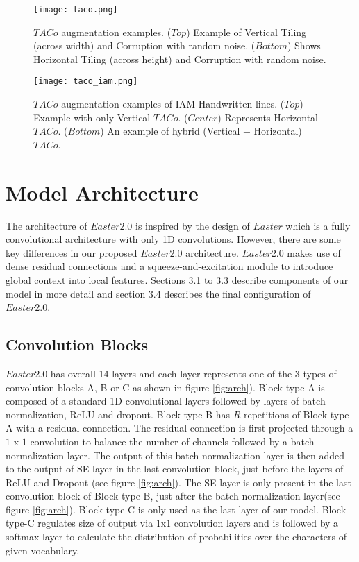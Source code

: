 \documentclass{article}
\begin{document}
\begin{figure}
  \centering
  \texttt{[image: taco.png]}
  \caption{$TACo$ augmentation examples. ($Top$) Example of Vertical Tiling (across width) and Corruption with random noise. ($Bottom$) Shows Horizontal Tiling (across height) and Corruption with random noise.}
  \label{fig:TACo}
\end{figure}

\begin{figure}
  \centering
  \texttt{[image: taco\_iam.png]}
  \caption{$TACo$ augmentation examples of IAM-Handwritten-lines. ($Top$) Example with only Vertical $TACo$. ($Center$) Represents Horizontal $TACo$. ($Bottom$) An example of hybrid (Vertical + Horizontal) $TACo$.}
  \label{fig:taco_iam}
\end{figure}

\section{Model Architecture}
\label{sec:headings}
The architecture of $Easter2.0$ is inspired by the design of $Easter$\cite{Chaudhary2021EASTER} which is a fully convolutional architecture with only 1D convolutions. However, there are some key differences in our proposed $Easter2.0$ architecture. $Easter2.0$ makes use of dense residual connections and a squeeze-and-excitation module to introduce global context into local features. Sections 3.1 to 3.3 describe components of our model in more detail and section 3.4 describes the final configuration of $Easter2.0$.

\subsection{Convolution Blocks}
$Easter2.0$ has overall 14 layers and each layer represents one of the 3 types of convolution blocks A, B or C as shown in figure \ref{fig:arch}). Block type-A is composed of a standard 1D convolutional layers followed by layers of batch normalization, ReLU and dropout. Block type-B has $R$ repetitions of Block type-A with a residual connection. The residual connection is first projected through a $1$ x $1$ convolution to balance the number of channels followed by a batch normalization layer. The output of this batch normalization layer is then added to the output of SE layer in the last convolution block, just before the layers of ReLU and Dropout (see figure  \ref{fig:arch}). The SE layer is only present in the last convolution block of Block type-B, just after the batch normalization layer(see figure \ref{fig:arch}). Block type-C is only used as the last layer of our model. Block type-C regulates size of output via $1$x$1$ convolution layers and is followed by a softmax layer to calculate the distribution of probabilities over the characters of given vocabulary.
\end{document}
